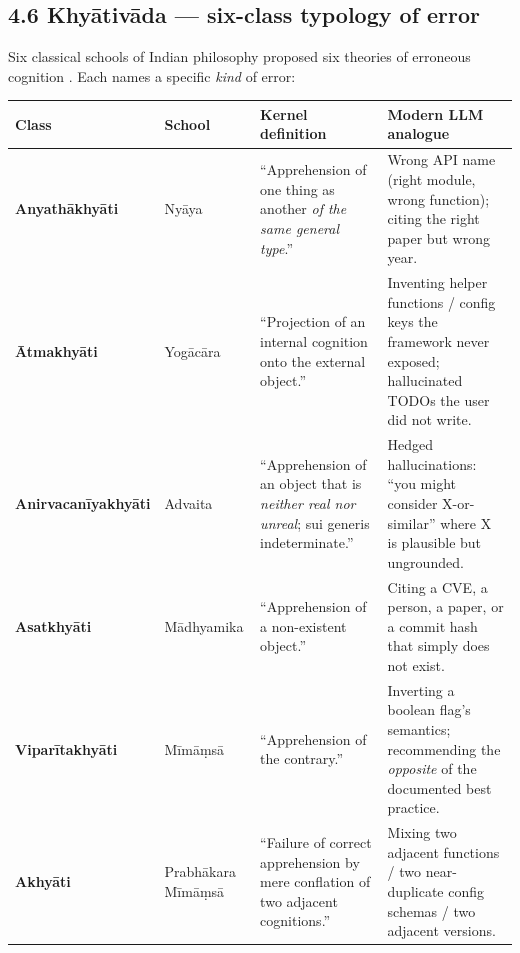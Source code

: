\subsection{4.6 Khyātivāda --- six-class typology of error}\label{khyux101tivux101da-six-class-typology-of-error}

Six classical schools of Indian philosophy proposed six theories of erroneous cognition \citep{ram2007error, matilal1986perception, datta1932advaita, bhatt1989prabhakara, bilimoria2018epistemology, mohanty1992reason}. Each names a specific \emph{kind} of error:

{\def\LTcaptype{none} %
\begin{longtable}[]{@{}
  >{\raggedright\arraybackslash}p{}
  >{\raggedright\arraybackslash}p{}
  >{\raggedright\arraybackslash}p{}
  >{\raggedright\arraybackslash}p{}@{}}
\toprule\noalign{}
\begin{minipage}[b]{\linewidth}\raggedright
Class
\end{minipage} & \begin{minipage}[b]{\linewidth}\raggedright
School
\end{minipage} & \begin{minipage}[b]{\linewidth}\raggedright
Kernel definition
\end{minipage} & \begin{minipage}[b]{\linewidth}\raggedright
Modern LLM analogue
\end{minipage} \\
\midrule\noalign{}
\endhead
\bottomrule\noalign{}
\endlastfoot
\textbf{Anyathākhyāti} & Nyāya & ``Apprehension of one thing as another \emph{of the same general type}.'' & Wrong API name (right module, wrong function); citing the right paper but wrong year. \\
\textbf{Ātmakhyāti} & Yogācāra & ``Projection of an internal cognition onto the external object.'' & Inventing helper functions / config keys the framework never exposed; hallucinated TODOs the user did not write. \\
\textbf{Anirvacanīyakhyāti} & Advaita & ``Apprehension of an object that is \emph{neither real nor unreal}; sui generis indeterminate.'' & Hedged hallucinations: ``you might consider X-or-similar'' where X is plausible but ungrounded. \\
\textbf{Asatkhyāti} & Mādhyamika & ``Apprehension of a non-existent object.'' & Citing a CVE, a person, a paper, or a commit hash that simply does not exist. \\
\textbf{Viparītakhyāti} & Mīmāṃsā & ``Apprehension of the contrary.'' & Inverting a boolean flag's semantics; recommending the \emph{opposite} of the documented best practice. \\
\textbf{Akhyāti} & Prabhākara Mīmāṃsā & ``Failure of correct apprehension by mere conflation of two adjacent cognitions.'' & Mixing two adjacent functions / two near-duplicate config schemas / two adjacent versions. \\
\end{longtable}
}

